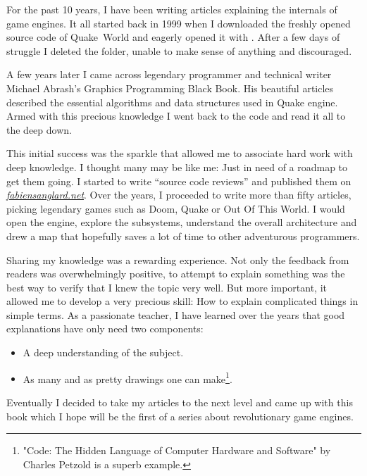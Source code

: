 \documentclass[book.tex]{subfiles}
\begin{document}
For the past 10 years, I have been writing articles explaining the internals of game engines. It all started back in 1999 when I downloaded the freshly opened source code of \mbox{Quake World} and eagerly opened it with . After a few days of struggle I deleted the  folder, unable to make sense of anything and discouraged.

\bigskip

A few years later I came across legendary programmer and technical writer Michael Abrash's Graphics Programming Black Book. His beautiful articles described the essential algorithms and data structures used in Quake engine. Armed with this precious knowledge I went back to the code and read it all to the deep down.

\bigskip

This initial success was the sparkle that allowed me to associate hard work with deep knowledge. I thought many may be like me: Just in need of a roadmap to get them going. I started to write ``source  code reviews'' and published them on 
\href{http://fabiensanglard.net}{\textit{fabiensanglard.net}}. Over the years, I proceeded to write more than fifty articles,  picking legendary games such as Doom, Quake or Out Of This World. I would open the engine, explore the subsystems, understand the overall architecture and drew a map that hopefully saves a lot of time to other adventurous programmers.

\bigskip

Sharing my knowledge was a rewarding experience. Not only the feedback from readers was overwhelmingly positive, to attempt to explain something was the best way to verify that I knew the topic very well. But more important, it allowed me to develop a very precious skill: How to explain complicated things in simple terms. As a passionate teacher, I have learned over the years that good explanations have only need two components: 
\begin{itemize} 
\item A deep understanding of the subject. 
\item As many and as pretty drawings one can make\footnote{"Code: The Hidden Language of Computer Hardware and Software" by Charles Petzold is a superb example.}.
\end{itemize} 

\bigskip

Eventually I decided to take my articles to the next level and came up with this book which I hope will be the first of a series about revolutionary game engines. 
\end{document}
